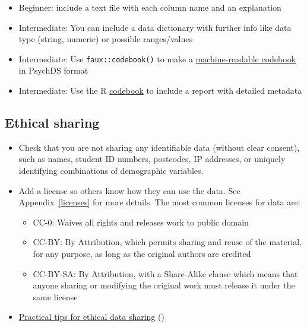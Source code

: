 \documentclass[
  oneside]{book}
\providecommand{\tightlist}{%
  \setlength{\itemsep}{0pt}\setlength{\parskip}{0pt}}
\begin{document}
\begin{itemize}
\tightlist
\item
  {Beginner}: include a text file with each column name and an explanation
\item
  {Intermediate}: You can include a data dictionary with further info like data type (string, numeric) or possible ranges/values \citep{buchanan2021getting}
\item
  {Intermediate}: Use \texttt{faux::codebook()} to make a \href{https://debruine.github.io/faux/articles/codebook.html}{machine-readable codebook} in PsychDS format
\item
  {Intermediate}: Use the R \href{https://rubenarslan.github.io/codebook/articles/codebook_tutorial.html}{codebook} to include a report with detailed metadata \citep{horstmann2020generating}
\end{itemize}

\hypertarget{ethical-sharing}{%
\subsection{Ethical sharing}\label{ethical-sharing}}

\begin{itemize}
\tightlist
\item
  Check that you are not sharing any identifiable data (without clear consent), such as names, student ID numbers, postcodes, IP addresses, or uniquely identifying combinations of demographic variables.
\item
  Add a license so others know how they can use the data. See Appendix~\ref{licenses} for more details. The most common licenses for data are:

  \begin{itemize}
  \tightlist
  \item
    CC-0: Waives all rights and releases work to public domain
  \item
    CC-BY: By Attribution, which permits sharing and reuse of the material, for any purpose, as long as the original authors are credited
  \item
    CC-BY-SA: By Attribution, with a Share-Alike clause which means that anyone sharing or modifying the original work must release it under the same license
  \end{itemize}
\item
  \href{https://doi.org/10.1177/2515245917747656}{Practical tips for ethical data sharing} (\citet{meyer2018practical})
\end{itemize}
\end{document}
